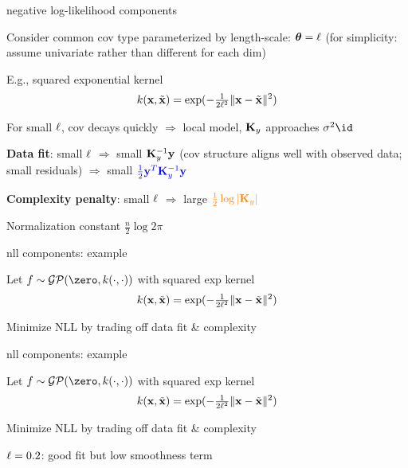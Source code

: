 \documentclass[11pt,compress,t,notes=noshow, xcolor=table]{beamer}
\begin{document}
\begin{framei}[sep=L]{negative log-likelihood components}
\item Consider common cov type parameterized by length-scale: $\bm{\theta} = \ell$ (for simplicity: assume univariate rather than different for each dim) 
\item E.g., squared exponential kernel $$k(\mathbf{x}, \tilde{\mathbf{x}}) = \exp(-\tfrac{1}{2 \ell^2} \| \mathbf{x} - \tilde{\mathbf{x}} \|^2)$$
\item For small $\ell$, cov decays quickly $\Rightarrow$ local model, $\mathbf{K}_y$ approaches $\sigma^2 \id$
\item \textbf{Data fit}: small $\ell$ $\Rightarrow$ small $\mathbf{K}_y^{-1} \mathbf{y}$ (cov structure aligns well with observed data; small residuals) $\Rightarrow$ small $\textcolor{blue}{\tfrac{1}{2} \mathbf{y}^T \mathbf{K}_y^{-1} \mathbf{y}}$
\item \textbf{Complexity penalty}: small  $\ell$ $\Rightarrow$ large $\textcolor{orange}{\tfrac{1}{2} \log | \mathbf{K}_y |}$
\item Normalization constant $\tfrac{n}{2} \log 2 \pi$
\end{framei}


\begin{framei}[sep=L]{nll components: example}
\item Let $f \sim \mathcal{GP}(\zero, k(\cdot, \cdot))$ with squared exp kernel $$k(\mathbf{x}, \tilde{\mathbf{x}}) = \exp(-\tfrac{1}{2 \ell^2} \| \mathbf{x} - \tilde{\mathbf{x}} \|^2)$$
\item Minimize NLL by trading off data fit \& complexity
\vfill
{}
\end{framei}

\begin{framei}[sep=L]{nll components: example}
\item Let $f \sim \gpzk$ with squared exp kernel $$k(\mathbf{x}, \tilde{\mathbf{x}}) = \exp(-\tfrac{1}{2 \ell^2} \| \mathbf{x} - \tilde{\mathbf{x}} \|^2)$$\item Minimize NLL by trading off data fit \& complexity
\item $\ell = 0.2$: good fit but low smoothness term
\vfill
{}
\end{framei}
\end{document}
